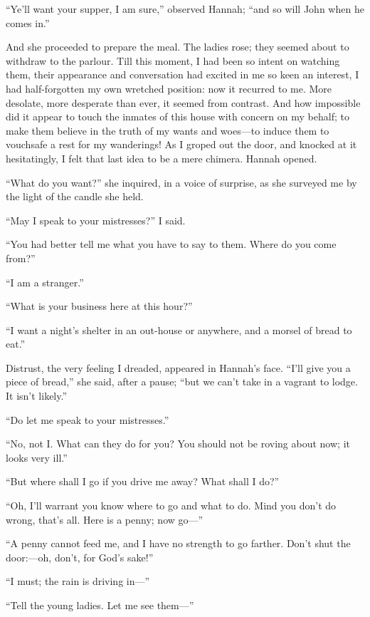 \enquote{Ye'll want your supper, I am sure,} observed Hannah;
\enquote{and so will \Mr{} \St{} John when he comes in.}

And she proceeded to prepare the meal. The ladies rose; they seemed
about to withdraw to the parlour. Till this moment, I had been so
intent on watching them, their appearance and conversation had excited
in me so keen an interest, I had half-forgotten my own wretched
position: now it recurred to me. More desolate, more desperate than
ever, it seemed from contrast. And how impossible did it appear to
touch the inmates of this house with concern on my behalf; to make them
believe in the truth of my wants and woes---to induce them to vouchsafe
a rest for my wanderings! As I groped out the door, and knocked at it
hesitatingly, I felt that last idea to be a mere chimera. Hannah
opened.

\enquote{What do you want?} she inquired, in a voice of surprise, as she
surveyed me by the light of the candle she held.

\enquote{May I speak to your mistresses?} I said.

\enquote{You had better tell me what you have to say to them. Where do
	you come from?}

\enquote{I am a stranger.}

\enquote{What is your business here at this hour?}

\enquote{I want a night's shelter in an out-house or anywhere, and a
	morsel of bread to eat.}

Distrust, the very feeling I dreaded, appeared in Hannah's face.
\enquote{I'll give you a piece of bread,} she said, after a pause;
\enquote{but we can't take in a vagrant to lodge. It isn't likely.}

\enquote{Do let me speak to your mistresses.}

\enquote{No, not I\@. What can they do for you? You should not be roving
	about now; it looks very ill.}

\enquote{But where shall I go if you drive me away? What shall I do?}

\enquote{Oh, I'll warrant you know where to go and what to do. Mind you
	don't do wrong, that's all. Here is a penny; now go---}

\enquote{A penny cannot feed me, and I have no strength to go farther.
	Don't shut the door:---oh, don't, for God's sake!}

\enquote{I must; the rain is driving in---}

\enquote{Tell the young ladies. Let me see them---}

